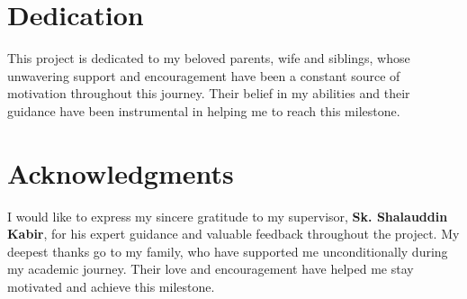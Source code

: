\documentclass{thesis-library}
\begin{document}
\newcommand{\thesisTitle}{JustLearn – Modern AI-Driven Learning Management Platform}
%

\renewcommand{\subtitle}{[ Thesis Subtitle ]}
\newcommand{\byLabel}{Submitted By:}
\newcommand{\studentID}{190138}
\newcommand{\studentRegYear}{Registration Year:2019-20}
\newcommand{\studentAcaYear}{Academic Year:2020-21}
\newcommand{\studentName}{Md Isa Ahamed San}
\newcommand{\supervisorLabel}{Supervisor:}
\newcommand{\supervisorName}{Sk. Shalauddin Kabir}
\newcommand{\supervisorDesig}{Lecturer}
\newcommand{\supervisorAff}{Department of Computer Science and Engineering}
\newcommand{\degreeLineBLabel}{Requirements for fulfillment the BSc.Engg. Degree}
\newcommand{\majorName}{In \textbf{Computer Science and Engineering}}
\newcommand{\facultyName}{Faculty of Engineering and Technology}
\newcommand{\universityName}{Jashore University of Science and Technology}
\newcommand{\regionName}{Jashore-7408, Bangladesh}
\newcommand{\degreeyearName}{2025}
\newcommand{\degreemonthName}{November}
\newcommand{\approvalText}{This project titled "JustLearn – Modern AI-Driven Learning Management Platform"
submitted by Md Isa Ahamed San for the pre-defense for the degree of BSc. in Computer Science and
Engineering on November 2025.}
\newcommand{\studentSign}{\underline{Signature of the Student}}
\newcommand{\supervisorSign}{\underline{Signature of the Supervisor}}

\makecoverpage
\makeapprovalpage

\chapter*{Dedication}
This project is dedicated to my beloved parents, wife and siblings, whose unwavering support and encouragement have been a constant source of motivation throughout this journey. Their belief in my abilities and their guidance have been instrumental in helping me to reach this milestone.

\chapter*{Acknowledgments}
I would like to express my sincere gratitude to my supervisor, \textbf{Sk. Shalauddin Kabir}, for his expert guidance and valuable feedback throughout the project. My deepest thanks go to my family, who have supported me unconditionally during my academic journey. Their love and encouragement have helped me stay motivated and achieve this milestone.
\end{document}
